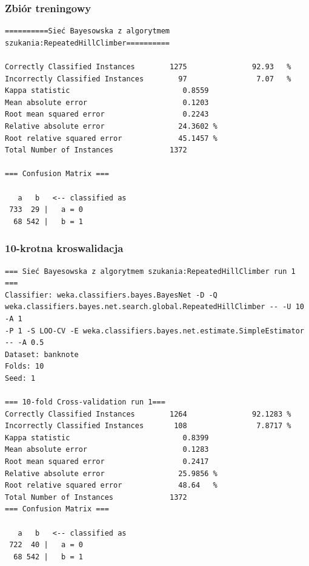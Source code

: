 \documentclass{classrep}
\begin{document}
\subsubsection*{Zbiór treningowy}
\scriptsize 
\begin{verbatim}
==========Sieć Bayesowska z algorytmem szukania:RepeatedHillClimber==========

Correctly Classified Instances        1275               92.93   %
Incorrectly Classified Instances        97                7.07   %
Kappa statistic                          0.8559
Mean absolute error                      0.1203
Root mean squared error                  0.2243
Relative absolute error                 24.3602 %
Root relative squared error             45.1457 %
Total Number of Instances             1372     

=== Confusion Matrix ===

   a   b   <-- classified as
 733  29 |   a = 0
  68 542 |   b = 1
\end{verbatim} 
\normalsize
\subsubsection*{10-krotna kroswalidacja}
\scriptsize 
\begin{verbatim}
=== Sieć Bayesowska z algorytmem szukania:RepeatedHillClimber run 1 ===
Classifier: weka.classifiers.bayes.BayesNet -D -Q
weka.classifiers.bayes.net.search.global.RepeatedHillClimber -- -U 10 -A 1
-P 1 -S LOO-CV -E weka.classifiers.bayes.net.estimate.SimpleEstimator -- -A 0.5
Dataset: banknote
Folds: 10
Seed: 1

=== 10-fold Cross-validation run 1===
Correctly Classified Instances        1264               92.1283 %
Incorrectly Classified Instances       108                7.8717 %
Kappa statistic                          0.8399
Mean absolute error                      0.1283
Root mean squared error                  0.2417
Relative absolute error                 25.9856 %
Root relative squared error             48.64   %
Total Number of Instances             1372     
=== Confusion Matrix ===

   a   b   <-- classified as
 722  40 |   a = 0
  68 542 |   b = 1
\end{verbatim} 
\normalsize
\end{document}
